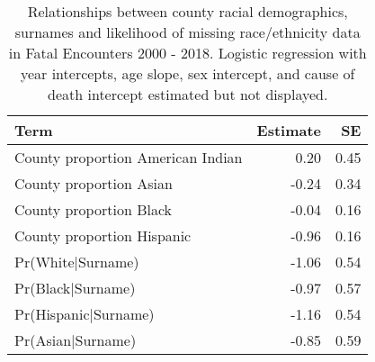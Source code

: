 \begin{table}[H]
\centering
\begin{tabular}{lrr}
  \hline
Term & Estimate & SE \\ 
  \hline
County proportion American Indian & 0.20 & 0.45 \\ 
  County proportion Asian & -0.24 & 0.34 \\ 
  County proportion Black & -0.04 & 0.16 \\ 
  County proportion Hispanic & -0.96 & 0.16 \\ 
  Pr(White$|$Surname) & -1.06 & 0.54 \\ 
  Pr(Black$|$Surname) & -0.97 & 0.57 \\ 
  Pr(Hispanic$|$Surname) & -1.16 & 0.54 \\ 
  Pr(Asian$|$Surname) & -0.85 & 0.59 \\ 
   \hline
\end{tabular}
\caption{Relationships between county racial demographics,
         surnames and likelihood of missing race/ethnicity data in Fatal Encounters 2000 - 2018.
         Logistic regression with year intercepts, age slope, sex intercept, and
         cause of death intercept estimated but not displayed.} 
\label{tab:missing_reg}
\end{table}
